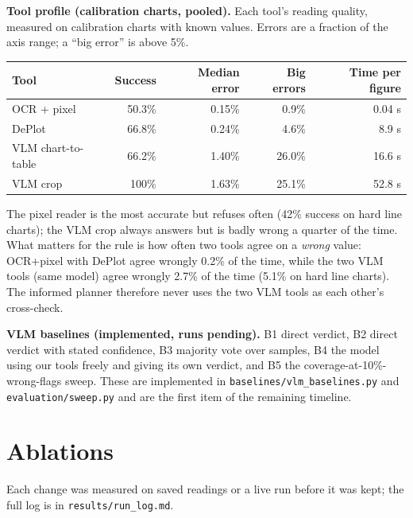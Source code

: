 \documentclass[11pt,a4paper]{article}
\newcommand{\code}[1]{\texttt{\small #1}}
\begin{document}
\textbf{Tool profile (calibration charts, pooled).} Each tool's reading quality, measured on calibration charts with known values. Errors are a fraction of the axis range; a ``big error'' is above 5\%.

\begin{center}\small
\begin{tabular}{lrrrr}
\toprule
Tool & Success & Median error & Big errors & Time per figure \\
\midrule
OCR + pixel & 50.3\% & 0.15\% & 0.9\% & 0.04 s \\
DePlot & 66.8\% & 0.24\% & 4.6\% & 8.9 s \\
VLM chart-to-table & 66.2\% & 1.40\% & 26.0\% & 16.6 s \\
VLM crop & 100\% & 1.63\% & 25.1\% & 52.8 s \\
\bottomrule
\end{tabular}
\end{center}

The pixel reader is the most accurate but refuses often (42\% success on hard line charts); the VLM crop always answers but is badly wrong a quarter of the time. What matters for the rule is how often two tools agree on a \emph{wrong} value: OCR+pixel with DePlot agree wrongly 0.2\% of the time, while the two VLM tools (same model) agree wrongly 2.7\% of the time (5.1\% on hard line charts). The informed planner therefore never uses the two VLM tools as each other's cross-check.

\textbf{VLM baselines (implemented, runs pending).} B1 direct verdict, B2 direct verdict with stated confidence, B3 majority vote over samples, B4 the model using our tools freely and giving its own verdict, and B5 the coverage-at-10\%-wrong-flags sweep. These are implemented in \code{baselines/vlm\_baselines.py} and \code{evaluation/sweep.py} and are the first item of the remaining timeline.

\section{Ablations}

Each change was measured on saved readings or a live run before it was kept; the full log is in \code{results/run\_log.md}.
\end{document}
